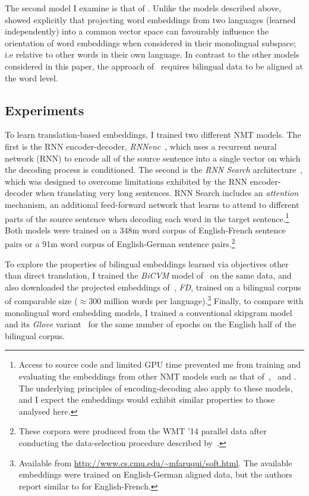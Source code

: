The second model I examine is that of \cite{faruqui2014improving}. Unlike the models described above, \cite{faruqui2014improving} showed explicitly that projecting word embeddings from two languages (learned independently) into a common vector space can favourably influence the orientation of word embeddings when considered in their monolingual subspace; i.e relative to other words in their own language. In contrast to the other models considered in this paper, the approach of~\cite{faruqui2014improving} requires bilingual data to be aligned at the word level.

\subsection{Experiments}

To learn translation-based embeddings, I trained two different NMT models. The first is the RNN encoder-decoder, \emph{RNNenc}~\citep{Cho2014}, which uses a recurrent neural network (RNN) to encode all of the source sentence into a single vector on which the decoding process is conditioned. The second is the \emph{RNN Search} architecture~\citep{bahdanau2014neural}, which was designed to overcome limitations exhibited by the RNN encoder-decoder when translating very long sentences. RNN Search includes an \emph{attention} mechanism, an additional feed-forward network that learns to attend to different parts of the source sentence when decoding each word in the target sentence.\footnote{Access to source code and limited GPU time prevented me from training and evaluating the embeddings from other NMT models such as that of~\cite{kalchbrenner13emnlp},~\cite{devlin2014fast} and \cite{Sutskever2014sequence}. The underlying principles of encoding-decoding also apply to these models, and I expect the embeddings would exhibit similar properties to those analysed here.} Both models were trained on a 348m word corpus of English-French sentence pairs or a 91m word corpus of English-German sentence pairs.\footnote{These corpora were produced from the WMT ’14 parallel data after conducting the data-selection procedure described by~\cite{Cho2014}. } 

To explore the properties of bilingual embeddings learned via objectives other than direct translation, I trained the \emph{BiCVM} model of~\cite{Hermann:2014:ICLR} on the same data, and also downloaded the projected embeddings of~\cite{faruqui2014improving}, \emph{FD}, trained on a bilingual corpus of comparable size (\(\approx 300\) million words per language).\footnote{Available from \url{http://www.cs.cmu.edu/~mfaruqui/soft.html}. The available embeddings were trained on English-German aligned data, but the authors report similar to for English-French.} Finally, to compare with monolingual word embedding models, I trained a conventional skipgram model~\citep{mikolov2013distributed} and its \emph{Glove} variant~\citep{Pennington2014} for the same number of epochs on the English half of the bilingual corpus. 

